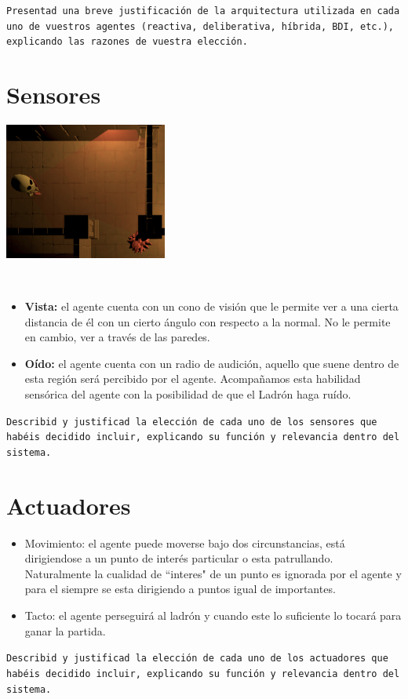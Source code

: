 \documentclass[a4paper,12.5pt]{article}
\begin{document}
\texttt{Presentad una breve justificación de la arquitectura utilizada en cada uno de vuestros agentes (reactiva, deliberativa, híbrida, BDI, etc.), explicando las razones de vuestra elección.}
\section*{\large Sensores}
\begin{center}{ \includegraphics[width=0.4\textwidth]{vision.png}}\end{center}\\
\begin{itemize}
	\item \textbf{Vista:} el agente cuenta con un cono de visión que le permite ver a una cierta distancia de él con un cierto ángulo con respecto a la normal. No le permite en cambio, ver a través de las paredes.
	\item \textbf{Oído:} el agente cuenta con un radio de audición, aquello que suene dentro de esta región será percibido por el agente. Acompañamos esta habilidad sensórica del agente con la posibilidad de que el Ladrón haga ruído.
\end{itemize}

\texttt{Describid y justificad la elección de cada uno de los sensores que habéis decidido incluir, explicando su función y relevancia dentro del sistema.}
\section*{\large Actuadores}
\begin{itemize}
	\item Movimiento: el agente puede moverse bajo dos circunstancias, está dirigiendose a un punto de interés particular o esta patrullando. Naturalmente la cualidad de ``interes" de un punto es ignorada por el agente y para el siempre se esta dirigiendo a puntos igual de importantes.
	\item Tacto: el agente perseguirá al ladrón y cuando este lo suficiente lo tocará para ganar la partida.
\end{itemize}
\texttt{Describid y justificad la elección de cada uno de los actuadores que habéis decidido incluir, explicando su función y relevancia dentro del sistema.}
\end{document}
